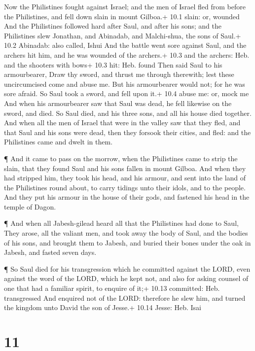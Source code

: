  Now the Philistines fought against Israel; and the men of
Israel fled from before the Philistines, and fell down slain in mount
Gilboa.+ 10.1 slain: or, wounded  And the Philistines
followed hard after Saul, and after his sons; and the Philistines slew
Jonathan, and Abinadab, and Malchi-shua, the sons of Saul.+ 10.2
Abinadab: also called, Ishui  And the battle went sore
against Saul, and the archers hit him, and he was wounded of the
archers.+ 10.3 and the archers: Heb. and the shooters with bows+ 10.3
hit: Heb. found  Then said Saul to his armourbearer, Draw
thy sword, and thrust me through therewith; lest these uncircumcised
come and abuse me. But his armourbearer would not; for he was sore
afraid. So Saul took a sword, and fell upon it.+ 10.4 abuse me: or, mock
me  And when his armourbearer saw that Saul was dead, he
fell likewise on the sword, and died.  So Saul died, and his
three sons, and all his house died together.  And when all
the men of Israel that were in the valley saw that they fled, and that
Saul and his sons were dead, then they forsook their cities, and fled:
and the Philistines came and dwelt in them.

 ¶ And it came to pass on the morrow, when the Philistines
came to strip the slain, that they found Saul and his sons fallen in
mount Gilboa.  And when they had stripped him, they took his
head, and his armour, and sent into the land of the Philistines round
about, to carry tidings unto their idols, and to the people.
 And they put his armour in the house of their gods, and
fastened his head in the temple of Dagon.

 ¶ And when all Jabesh-gilead heard all that the
Philistines had done to Saul,  They arose, all the valiant
men, and took away the body of Saul, and the bodies of his sons, and
brought them to Jabesh, and buried their bones under the oak in Jabesh,
and fasted seven days.

 ¶ So Saul died for his transgression which he committed
against the LORD, even against the word of the LORD, which he kept not,
and also for asking counsel of one that had a familiar spirit, to
enquire of it;+ 10.13 committed: Heb. transgressed  And
enquired not of the LORD: therefore he slew him, and turned the kingdom
unto David the son of Jesse.+ 10.14 Jesse: Heb. Isai

\hypertarget{section-10}{%
\section{11}\label{section-10}}

